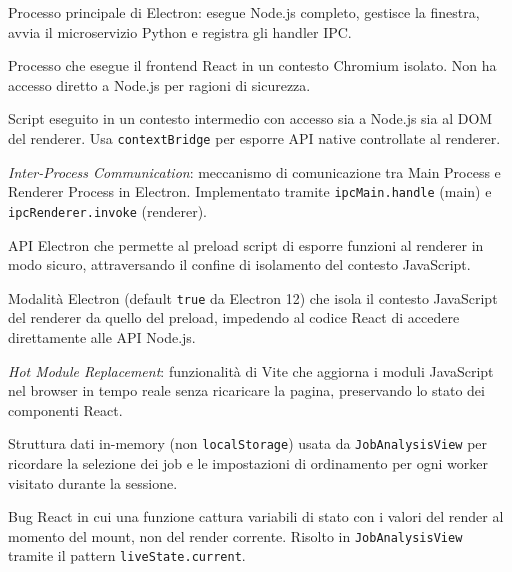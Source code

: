 \documentclass[a4paper,12pt]{article}
\begin{document}
\begin{description}[leftmargin=4cm, labelwidth=3.8cm, labelsep=0.2cm]

\item[\textbf{Main Process}]
  Processo principale di Electron: esegue Node.js completo, gestisce
  la finestra, avvia il microservizio Python e registra gli handler IPC.

\item[\textbf{Renderer Process}]
  Processo che esegue il frontend React in un contesto Chromium isolato.
  Non ha accesso diretto a Node.js per ragioni di sicurezza.

\item[\textbf{Preload Script}]
  Script eseguito in un contesto intermedio con accesso sia a Node.js sia
  al DOM del renderer. Usa \texttt{contextBridge} per esporre API native
  controllate al renderer.

\item[\textbf{IPC}]
  \textit{Inter-Process Communication}: meccanismo di comunicazione tra
  Main Process e Renderer Process in Electron. Implementato tramite
  \texttt{ipcMain.handle} (main) e \texttt{ipcRenderer.invoke} (renderer).

\item[\textbf{contextBridge}]
  API Electron che permette al preload script di esporre funzioni al
  renderer in modo sicuro, attraversando il confine di isolamento
  del contesto JavaScript.

\item[\textbf{contextIsolation}]
  Modalit\`{a} Electron (default \texttt{true} da Electron 12) che isola
  il contesto JavaScript del renderer da quello del preload, impedendo
  al codice React di accedere direttamente alle API Node.js.

\item[\textbf{HMR}]
  \textit{Hot Module Replacement}: funzionalit\`{a} di Vite che aggiorna
  i moduli JavaScript nel browser in tempo reale senza ricaricare la pagina,
  preservando lo stato dei componenti React.

\item[\textbf{Session cache}]
  Struttura dati in-memory (non \texttt{localStorage}) usata da
  \texttt{JobAnalysisView} per ricordare la selezione dei job e le
  impostazioni di ordinamento per ogni worker visitato durante la sessione.

\item[\textbf{Stale closure}]
  Bug React in cui una funzione cattura variabili di stato con i valori
  del render al momento del mount, non del render corrente. Risolto in
  \texttt{JobAnalysisView} tramite il pattern \texttt{liveState.current}.


\end{description}
\end{document}
